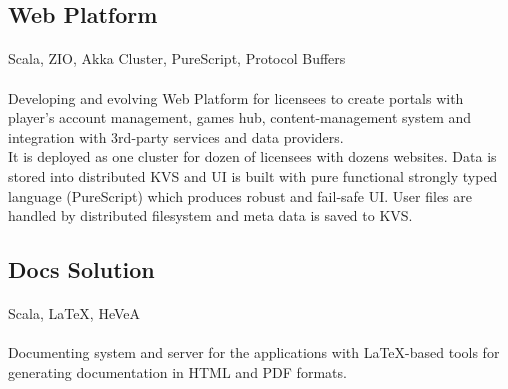 \subsection{Web Platform}
\paragraph{} Scala, ZIO, Akka Cluster, PureScript, Protocol Buffers
\paragraph{}
Developing and evolving Web Platform for licensees to create portals with player's account management, games hub, content-management system and integration with 3rd-party services and data providers.\\
It is deployed as one cluster for dozen of licensees with dozens websites. Data is stored into distributed KVS and UI is built with pure functional strongly typed language (PureScript) which produces robust and fail-safe UI. User files are handled by distributed filesystem and meta data is saved to KVS.

\subsection{Docs Solution}
\paragraph{} Scala, LaTeX, HeVeA
\paragraph{}
Documenting system and server for the applications with LaTeX-based tools for generating documentation in HTML and PDF formats.

